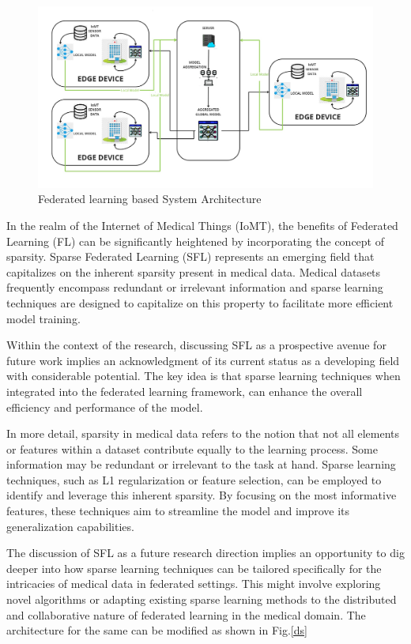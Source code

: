 \documentclass[conference]{IEEEtran}
\begin{document}
\begin{figure}[htp]
    \centering
    \includegraphics[scale = 0.14]{FL_ARCHITECTURE (3).jpg}
    \caption{Federated learning based System Architecture}
    \label{dis}
\end{figure}

In the realm of the Internet of Medical Things (IoMT), the benefits of Federated Learning (FL) can be significantly heightened by incorporating the concept of sparsity. Sparse Federated Learning (SFL) represents an emerging field that capitalizes on the inherent sparsity present in medical data. Medical datasets frequently encompass redundant or irrelevant information and sparse learning techniques are designed to capitalize on this property to facilitate more efficient model training.

Within the context of the research, discussing SFL as a prospective avenue for future work implies an acknowledgment of its current status as a developing field with considerable potential. The key idea is that sparse learning techniques when integrated into the federated learning framework, can enhance the overall efficiency and performance of the model.

In more detail, sparsity in medical data refers to the notion that not all elements or features within a dataset contribute equally to the learning process. Some information may be redundant or irrelevant to the task at hand. Sparse learning techniques, such as L1 regularization or feature selection, can be employed to identify and leverage this inherent sparsity. By focusing on the most informative features, these techniques aim to streamline the model and improve its generalization capabilities.

The discussion of SFL as a future research direction implies an opportunity to dig deeper into how sparse learning techniques can be tailored specifically for the intricacies of medical data in federated settings. This might involve exploring novel algorithms or adapting existing sparse learning methods to the distributed and collaborative nature of federated learning in the medical domain. The architecture for the same can be modified as shown in Fig.\ref{ds}
\end{document}
